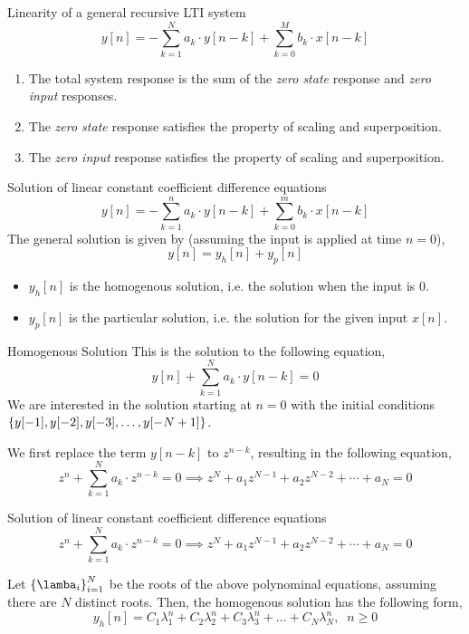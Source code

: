 \documentclass[aspectratio=169]{beamer}
\let\olditem\item
\renewcommand{\item}{\setlength{\itemsep}{\fill}\olditem}
\def\lc{\ensuremath\left\{}
\def\rc{\ensuremath\right\}}
\begin{document}
\begin{frame}[t]{Linearity of a general recursive LTI system}
\[ y[n] = -\sum_{k=1}^N a_k \cdot y[n - k] + \sum_{k=0}^{M} b_k \cdot x[n-k] \]
\begin{enumerate}
  \item The total system response is the sum of the \textit{zero state} response and \textit{zero input} responses.
  \item The \textit{zero state} response satisfies the property of scaling and superposition.
  \item The \textit{zero input} response satisfies the property of scaling and superposition.
\end{enumerate}
\end{frame}

\begin{frame}[t]{Solution of linear constant coefficient difference equations}
\[ y[n] = -\sum_{k=1}^n a_k \cdot y[n - k] + \sum_{k=0}^{m} b_k \cdot x[n-k] \]
The general solution is given by (assuming the input is applied at time $n = 0$),
\[ y[n] = y_{h}[n] + y_p[n] \]
\begin{itemize}
  \item  $y_h[n]$ is the homogenous solution, i.e. the solution when the input is $0$.
  \item  $y_p[n]$ is the particular solution, i.e. the solution for the given input $x[n]$.
\end{itemize}
\end{frame}

\begin{frame}[t]{Homogenous Solution}
This is the solution to the following equation,
\[ y[n] + \sum_{k=1}^N a_k \cdot y[n - k] = 0\]
We are interested in the solution starting at $n=0$ with the initial conditions $\lc y[-1], y[-2], y[-3], \ldots, y[-N+1]\rc$.

\vspace{0.5cm} 

We first replace the term $y[n-k]$ to $z^{n-k}$, resulting in the following equation,
\[ z^n + \sum_{k=1}^N a_k \cdot z^{n - k} = 0 \implies z^N + a_1z^{N-1} + a_2z^{N-2} + \cdots + a_N = 0 \] 
\end{frame}

\begin{frame}[t]{Solution of linear constant coefficient difference equations}
\[ z^n + \sum_{k=1}^N a_k \cdot z^{n - k} = 0 \implies z^N + a_1z^{N-1} + a_2z^{N-2} + \cdots + a_N = 0 \]

Let $\lc \lamba_i \rc_{i=1}^N$ be the roots of the above polynominal equations, assuming there are $N$ distinct roots. Then, the homogenous solution has the following form,
\[ y_h[n] = C_1 \lambda_1^n + C_2 \lambda_2^n + C_3 \lambda_3^n + \ldots + C_N \lambda_N^n , \,\,\ n \geq 0 \]

\end{frame}
\end{document}
